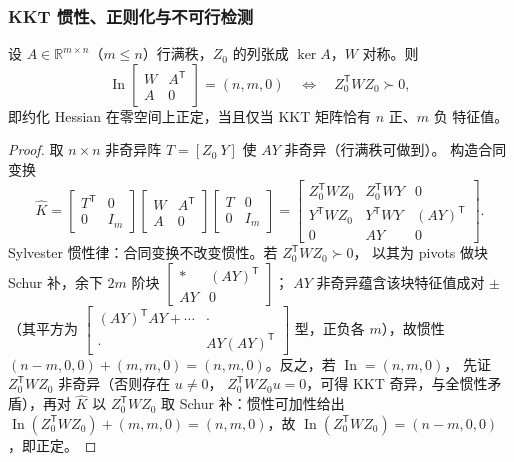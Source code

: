 \subsubsection{KKT 惯性、正则化与不可行检测}

\begin{theorem}\label{thm:opf-th-gen-inertia}
设 $A\in\mathbb R^{m\times n}$（$m\le n$）行满秩，$Z_0$ 的列张成
$\ker A$，$W$ 对称。则
\begin{equation}
\operatorname{In}\begin{bmatrix}W&A^{\mathsf T}\\ A&0\end{bmatrix}
=(n,m,0)\quad\Longleftrightarrow\quad Z_0^{\mathsf T}WZ_0\succ0,
\label{eq:opf-th-gen-inertia}
\end{equation}
即约化 Hessian 在零空间上正定，当且仅当 KKT 矩阵恰有 $n$ 正、$m$ 负
特征值\cite{opft:gould-inertia}。
\end{theorem}

\begin{proof}
取 $n\times n$ 非奇异阵 $T=[Z_0\ Y]$ 使 $AY$ 非奇异（行满秩可做到）。
构造合同变换
\begin{equation}
\widehat K=
\begin{bmatrix}T^{\mathsf T}&0\\0&I_m\end{bmatrix}
\begin{bmatrix}W&A^{\mathsf T}\\A&0\end{bmatrix}
\begin{bmatrix}T&0\\0&I_m\end{bmatrix}
=
\begin{bmatrix}
Z_0^{\mathsf T}WZ_0 & Z_0^{\mathsf T}WY & 0\\
Y^{\mathsf T}WZ_0 & Y^{\mathsf T}WY & (AY)^{\mathsf T}\\
0 & AY & 0
\end{bmatrix}.
\end{equation}
Sylvester 惯性律：合同变换不改变惯性。若 $Z_0^{\mathsf T}WZ_0\succ0$，
以其为 pivots 做块 Schur 补，余下 $2m$ 阶块
$\begin{bmatrix}*&(AY)^{\mathsf T}\\AY&0\end{bmatrix}$；
$AY$ 非奇异蕴含该块特征值成对 $\pm$（其平方为
$\begin{bmatrix}(AY)^{\mathsf T}AY+\cdots&\cdot\\\cdot&
AY(AY)^{\mathsf T}\end{bmatrix}$ 型，正负各 $m$），故惯性
$(n-m,0,0)+(m,m,0)=(n,m,0)$。反之，若 $\operatorname{In}=(n,m,0)$，
先证 $Z_0^{\mathsf T}WZ_0$ 非奇异（否则存在 $u\neq0$，
$Z_0^{\mathsf T}WZ_0u=0$，可得 KKT 奇异，与全惯性矛盾），再对
$\widehat K$ 以 $Z_0^{\mathsf T}WZ_0$ 取 Schur 补：惯性可加性给出
$\operatorname{In}(Z_0^{\mathsf T}WZ_0)+(m,m,0)=(n,m,0)$，故
$\operatorname{In}(Z_0^{\mathsf T}WZ_0)=(n-m,0,0)$，即正定。
\end{proof}

